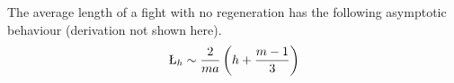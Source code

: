 The average length of a fight with no regeneration has the following asymptotic behaviour (derivation not shown here).
\begin{align}\label{eq:asymptoticAppr}
\L_h \sim \frac{2}{ma}\left(h + \frac{m-1}{3}\right)
\end{align}


